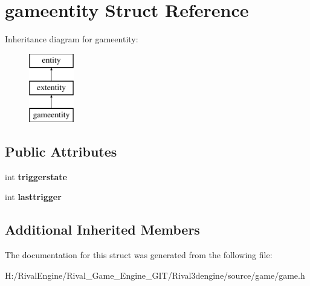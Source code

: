 \hypertarget{structgameentity}{}\section{gameentity Struct Reference}
\label{structgameentity}
Inheritance diagram for gameentity\+:\begin{figure}[H]
\begin{center}
\leavevmode
\includegraphics[height=3.000000cm]{structgameentity}
\end{center}
\end{figure}
\subsection*{Public Attributes}
\begin{DoxyCompactItemize}
\item 
\mbox{\label{structgameentity_a3695aeb4f84784f035661b41aa76fcbd}} 
int {\bfseries triggerstate}
\item 
\mbox{\label{structgameentity_ae7dbfea7e0f3e1c10b7744f5153b4fd4}} 
int {\bfseries lasttrigger}
\end{DoxyCompactItemize}
\subsection*{Additional Inherited Members}


The documentation for this struct was generated from the following file\+:\begin{DoxyCompactItemize}
\item 
H\+:/\+Rival\+Engine/\+Rival\+\_\+\+Game\+\_\+\+Engine\+\_\+\+G\+I\+T/\+Rival3dengine/source/game/game.\+h\end{DoxyCompactItemize}
